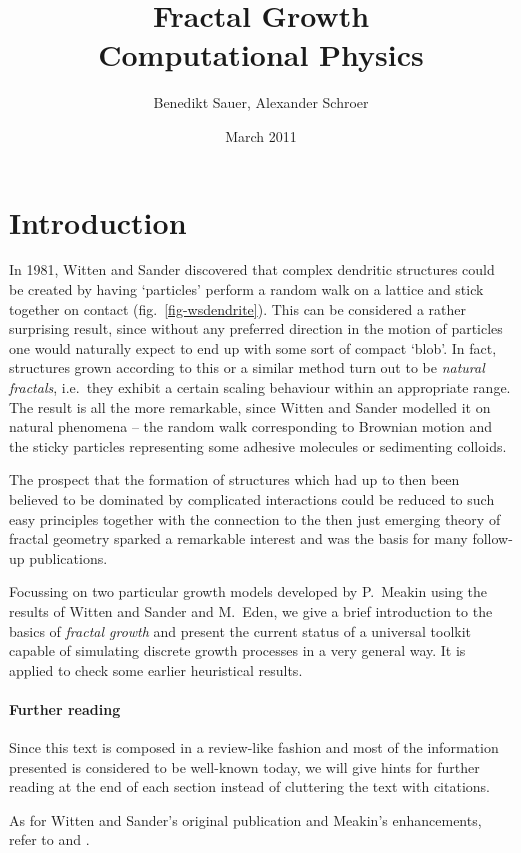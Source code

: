 \documentclass[twocolumn,10pt]{scrartcl}
\begin{document}
    \title{Fractal Growth \\ {\small Computational Physics}}
    \author{\small Benedikt Sauer, Alexander Schroer}
    \date{\small March 2011}

    \maketitle
 
    \section{Introduction}
        In 1981, Witten and Sander discovered that complex dendritic structures could be created by having
        `particles' perform a random walk on a lattice and stick together on contact (fig.~\ref{fig-wsdendrite}).
        This can be considered a rather surprising result, since without any preferred direction in the motion of
        particles one would naturally expect to end up with some sort of compact `blob'. In fact, structures grown
        according to this or a similar method turn out to be \emph{natural fractals}, i.e.\ they exhibit a certain 
        scaling behaviour within an appropriate range. The result is all the more remarkable, since Witten and Sander
        modelled it on natural phenomena -- the random walk corresponding to Brownian motion and the sticky particles
        representing some adhesive molecules or sedimenting colloids.

        The prospect that the formation of structures which had up to then been believed to be dominated by complicated
        interactions could be reduced to such easy principles together with the connection to the then just emerging
        theory of fractal geometry sparked a remarkable interest and was the basis for many follow-up publications.

        Focussing on two particular growth models developed by P.~Meakin using the results of Witten and Sander and
        M.~Eden, we give a brief introduction to the basics of \emph{fractal growth} and present the current status of a
        universal toolkit capable of simulating discrete growth processes in a very general way. It is applied to check
        some earlier heuristical results.

        {\small
            \paragraph{Further reading}
                Since this text is composed in a review-like fashion and most of the information presented is
                considered to be well-known today, we will give hints for further reading at the end of each
                section instead of cluttering the text with citations.

                As for Witten and Sander's original publication and Meakin's enhancements, refer to
                \cite{src-wittensander} and \cite{src-meakin1}.
        }
\end{document}
